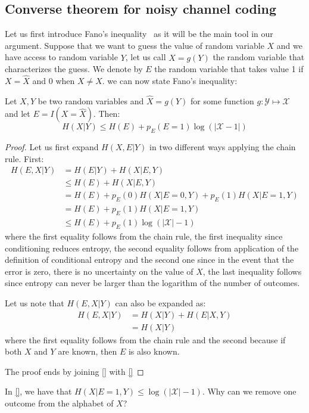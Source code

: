 \subsection{Converse theorem for noisy channel coding}
Let us first introduce Fano's inequality~\cite{Fano_61} as it will be the main tool in our argument. Suppose that we want to guess the value of random variable $X$ and we have access to random variable $Y$, let us call $\hat X=g(Y)$ the random variable that characterizes the guess. We denote by $E$ the random variable that takes value 1 if $X=\hat X$ and 0 when $X\neq\hat X$. we can now state Fano's inequality:
\begin{theorem}
Let $X,Y$ be two random variables and $\hat X=g(Y)$ for some function $g:\mathcal Y\mapsto\mathcal X$ and let $E=I(X=\hat X)$. Then:
\begin{equation}
H(X|Y)\leq H(E) + p_E(E=1)\log(|\mathcal X -1|)
\end{equation}
\end{theorem}
\begin{proof}
Let us first expand $H(X,E|Y)$ in two different ways applying the chain rule. First:
\begin{align}
H(E,X|Y) &= H(E|Y)+H(X|E,Y)\\
         &\leq H(E) + H(X|E,Y)\\
         &= H(E) + p_E(0) H(X|E=0, Y) + p_E(1)H(X|E=1,Y)\\
         &= H(E) + p_E(1)H(X|E=1,Y)\\
         &\leq H(E) + p_E(1)\log(|\mathcal X|-1)
\end{align}
where the first equality follows from the chain rule, the first inequality since conditioning reduces entropy, the second equality follows from application of the definition of conditional entropy and the second one since in the event that the error is zero, there is no uncertainty on the value of $X$, the last inequality follows since entropy can never be larger than the logarithm of the number of outcomes.

Let us note that $H(E,X|Y)$ can also be expanded as:
\begin{align}
H(E,X|Y)&=H(X|Y)+H(E|X,Y)\\
        &=H(X|Y)
\end{align}
where the first equality follows from the chain rule and the second because if both $X$ and $Y$ are known, then $E$ is also known.

The proof ends by joining \eqref{} with \eqref{}
\end{proof}
\begin{exercise}
In \eqref{}, we have that $H(X|E=1,Y)\leq \log(|\mathcal X|-1)$. Why can we remove one outcome from the alphabet of $X$?
\end{exercise}
